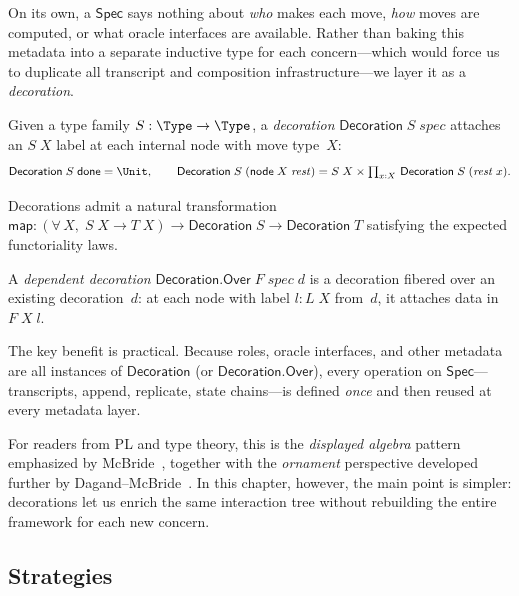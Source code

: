 On its own, a $\mathsf{Spec}$ says nothing about \emph{who} makes each move,
\emph{how} moves are computed, or what oracle interfaces are available.  Rather
than baking this metadata into a separate inductive type for each concern---which
would force us to duplicate all transcript and composition infrastructure---we
layer it as a \emph{decoration}.

\begin{definition}[Decoration]
  \label{int:decoration}
  Given a type family $S : \Type \to \Type$, a \emph{decoration}
  $\mathsf{Decoration}\;S\;\mathit{spec}$ attaches an $S\;X$ label at each
  internal node with move type~$X$:
  \[
    \mathsf{Decoration}\;S\;\mathsf{done} = \Unit, \qquad
    \mathsf{Decoration}\;S\;(\mathsf{node}\;X\;\mathit{rest}) =
      S\;X \times \textstyle\prod_{x : X}\,
        \mathsf{Decoration}\;S\;(\mathit{rest}\;x).
  \]
\end{definition}

Decorations admit a natural transformation $\mathsf{map} :
(\forall\,X,\; S\;X \to T\;X) \to \mathsf{Decoration}\;S \to
\mathsf{Decoration}\;T$ satisfying the expected functoriality laws.

\begin{definition}
  \label{int:decoration-over}
  A \emph{dependent decoration}
  $\mathsf{Decoration.Over}\;F\;\mathit{spec}\;d$ is a decoration fibered
  over an existing decoration~$d$: at each node with label $l : L\;X$ from~$d$,
  it attaches data in $F\;X\;l$.
\end{definition}

The key benefit is practical.  Because roles, oracle interfaces, and other
metadata are all instances of $\mathsf{Decoration}$ (or
$\mathsf{Decoration.Over}$), every operation on $\mathsf{Spec}$---transcripts,
append, replicate, state chains---is defined \emph{once} and then reused at
every metadata layer.

For readers from PL and type theory, this is the \emph{displayed algebra}
pattern emphasized by McBride~\cite{McBride2010}, together with the
\emph{ornament} perspective developed further by
Dagand--McBride~\cite{DagandMcBride2014}.  In this chapter, however, the main
point is simpler: decorations let us enrich the same interaction tree without
rebuilding the entire framework for each new concern.

\subsection{Strategies}

